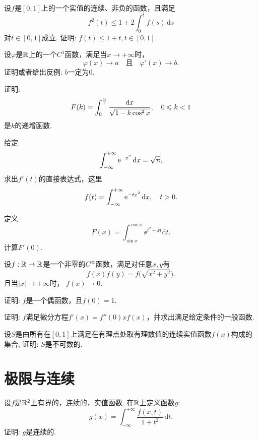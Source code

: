 \begin{example}
  设$f$是$[0,1]$上的一个实值的连续、非负的函数，且满足
  \[ f^2(t)\le 1+2\int_0^tf(s)\,\mathrm ds \]
  对$t\in[0,1]$成立. 证明: $f(t)\le1+t,t\in[0,1]$.
\end{example}

\begin{example}
  设$\varphi$是$\mathbb R$上的一个$C^1$函数，满足当$x\to+\infty$时，
  \[ \varphi(x)\to a\quad \text{且}\quad \varphi'(x)\to b. \]
  证明或者给出反例: $b$一定为0.
\end{example}

\begin{example}
  证明:
  \[ F(k) = \int_0^{\frac{\uppi}2}\frac{\mathrm dx}{\sqrt{1-k\cos^2x}},\quad 0\leqslant k<1 \]
  是$k$的递增函数.
\end{example}

\begin{example}
  给定
  \[ \int_{-\infty}^{+\infty}\operatorname{\!\!\;\mathrm e}^{-x^2}\mathrm dx=\sqrt{\uppi}, \]
  求出$f'(t)$的直接表达式，这里
  \[ f(t)= \int_{-\infty}^{+\infty}\operatorname{\!\!\;\mathrm e}^{-tx^2}\mathrm dx,\quad t>0.\]
\end{example}

\begin{example}
  定义
  \[ F(x)=\int_{\sin x}^{\cos x}\ee^{t^2+xt}\mathrm dt. \]
  计算$F'(0)$.
\end{example}

\begin{example}
  设$f:\mathbb R\to\mathbb R$是一个非零的$C^\infty$函数，满足对任意$x,y$有
  \[ f(x)f(y)=f\Big(\sqrt{x^2+y^2}\Big). \]
  且当$|x|\to+\infty$时， $f(x)\to0$.
  \begin{eenum}
    \item 证明: $f$是一个偶函数，且$f(0)=1$.
    \item 证明: $f$满足微分方程$f'(x)=f''(0)xf(x)$，并求出满足给定条件的一般函数.
  \end{eenum}
\end{example}

\begin{example}
  设$S$是由所有在$[0,1]$上满足在有理点处取有理数值的连续实值函数$f(x)$构成的集合, 证明: $S$是不可数的.
\end{example}

\section{极限与连续}
\begin{example}
  设$f$是$\mathbb R^2$上有界的，连续的，实值函数. 在$\mathbb R$上定义函数$g$:
  \[ g(x)=\int_{-\infty}^{+\infty}\frac{f(x,t)}{1+t^2}\,\mathrm dt.\]
  证明: $g$是连续的.
\end{example}

